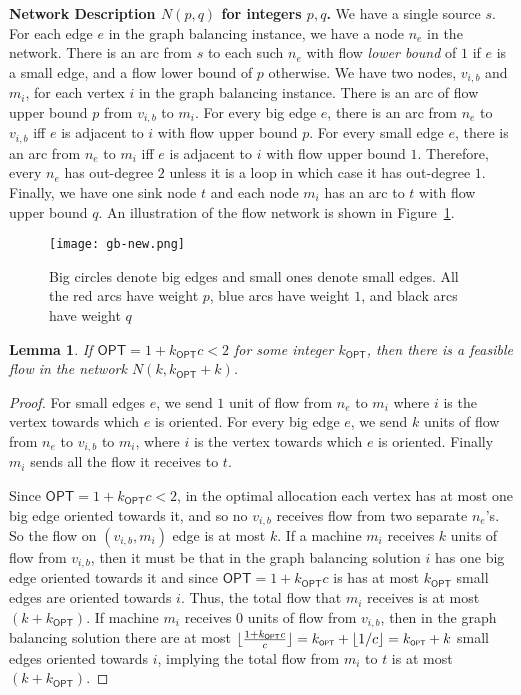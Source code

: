\documentclass[11pt]{article}
\newcommand{\OPT}{\mathsf{OPT}}
\newcommand{\kk}{k_{\scriptscriptstyle \OPT}}
\DeclarePairedDelimiter\floor{\lfloor}{\rfloor}
\newtheorem{lemma}{Lemma}
\begin{document}
\noindent
{\bf Network Description $N(p,q)$ for integers $p,q$.} We have a single source $s$. For each edge $e$ in the graph balancing instance, we have a node $n_e$ in the network. There is an arc from $s$ to each such $n_e$ 
with flow {\em lower bound} of $1$ if $e$ is a small edge, and a flow lower bound of $p$ otherwise. We have two nodes, $v_{i,b}$ and $m_i$, for each vertex $i$ in the graph balancing instance.
There is an arc of flow upper bound $p$ from $v_{i,b}$ to $m_i$.
For every big edge $e$, there is an arc from $n_e$ to $v_{i,b}$ iff $e$ is adjacent to $i$ with flow upper bound $p$. 
For every small edge $e$, there is an arc from $n_e$ to $m_{i}$ iff $e$ is adjacent to $i$ with flow upper bound $1$. 
Therefore, every $n_e$ has out-degree $2$ unless it is a loop in which case it has out-degree $1$. 
Finally, we have one sink node $t$ and each node $m_i$ has an arc to $t$ with flow upper bound  $q$. 
An illustration of the flow network is shown in Figure~\ref{fig:gb}.
\begin{figure}[h!]
	\begin{center}
		\texttt{[image: gb-new.png]}
	\end{center}
	\caption{\small Big circles denote big edges and small ones denote small edges. All the red arcs have weight $p$, blue arcs have weight $1$, and black arcs have weight $q$}
	\label{fig:gb}
\end{figure}

\begin{lemma}\label{lem:21}
If $\OPT = 1+\kk c < 2$ for some integer $\kk$, then there is a feasible flow in the network $N(k,\kk+k)$. \end{lemma}
\begin{proof}
	For small edges $e$, we send $1$ unit of flow from $n_e$ to $m_i$ where $i$ is the vertex towards which $e$ is oriented. 
	For every big edge $e$, we send $k$ units of flow from $n_e$ to $v_{i,b}$ to $m_i$, where $i$ is the vertex towards which $e$ is oriented. 
	Finally $m_i$ sends all the flow it receives to $t$.
	
	
	Since $\OPT = 1+\kk c < 2$, in the optimal allocation each vertex has at most one big edge oriented towards it, and so no $v_{i,b}$ receives flow from two separate $n_e$'s. So the flow on $(v_{i,b},m_i)$ edge is at most $k$. If a machine $m_i$ receives $k$ units of flow from $v_{i,b}$, then it must be that in the graph balancing solution $i$ has one big edge oriented towards it and since $\OPT = 1 + \kk c$ is has at most $\kk$ small edges are oriented towards $i$. Thus, the total flow that $m_i$ receives is at most $(k+\kk)$. If machine $m_i$ receives $0$ units of flow from $v_{i,b}$, then in the graph balancing solution there are at most $\floor{\frac{1+\kk c}{c}} = \kk + \floor{1/c} = \kk+k$ small edges oriented towards $i$, implying the total flow from $m_i$ to $t$ is at most $(k+\kk)$.
\end{proof}
\end{document}

